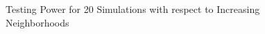 \documentclass[12pt]{article}
\begin{document}
\begin{figure}[htbp]
\hfil
{}
\caption{Testing Power for 20 Simulations with respect to Increasing Neighborhoods}
\label{figSim2}
\end{figure}
\end{document}
